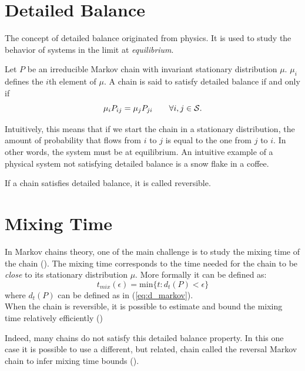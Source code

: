 \section{Detailed Balance}
The concept of detailed balance originated from physics. It is used to study the behavior of systems in the limit at \emph{equilibrium}. 
\begin{definition}
Let $P$ be an irreducible Markov chain with invariant stationary distribution $\mu$. $\mu_i$ defines the $i$th element of $\mu$. A chain is said to satisfy detailed balance if and only if
\begin{equation}
    \mu_i P_{ij} = \mu_j P_{ji} \qquad \forall i,j \in \mathcal{S}.
\end{equation}
\end{definition}
Intuitively, this means that if we start the chain in a stationary distribution, the amount of probability that flows from $i$ to $j$ is equal to the one from $j$ to $i$. In other words, the system must be at equilibrium. An intuitive example of a physical system not satisfying detailed balance is a snow flake in a coffee. 
\begin{remark}
If a chain satisfies detailed balance, it is called reversible.
\end{remark}

\section{Mixing Time}

In Markov chains theory, one of the main challenge is to study the mixing time of the chain (\cite{levin2017markov}). The mixing time corresponds to the time needed for the chain to be \emph{close} to its stationary distribution $\mu$. More formally it can be defined as:
\begin{equation}
    t_{mix}(\epsilon) = \text{min} \{ t : d_t(P) < \epsilon \}
\end{equation}
where $d_t(P)$ can be defined as in (\ref{eq:d_markov}).\\
When the chain is reversible, it is possible to estimate and bound the mixing time relatively efficiently (\cite{diaconis1991geometric,})

Indeed, many chains do not satisfy this detailed balance property. In this one case it is possible to use a different, but related, chain called the reversal Markov chain to infer mixing time bounds (\cite{fill1991eigenvalue,chung2012chernoff}).




